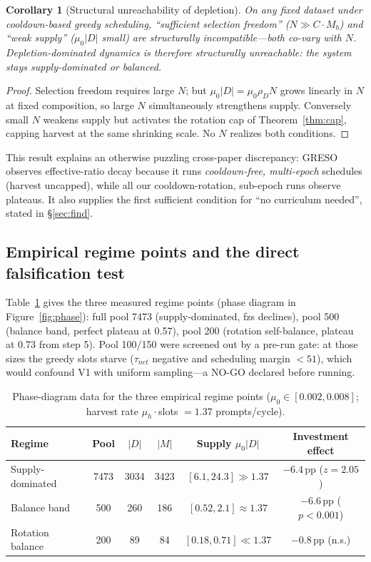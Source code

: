 \documentclass[11pt]{article}
\newtheorem{corollary}[theorem]{Corollary}
\theoremstyle{definition}
\begin{document}
\begin{corollary}[Structural unreachability of depletion]\label{cor:unreach}
On any fixed dataset under cooldown-based greedy scheduling, ``sufficient
selection freedom'' ($N\gg C\cdot M_b$) and ``weak supply'' ($\mu_0|D|$ small) are
structurally incompatible---both co-vary with $N$. Depletion-dominated dynamics is
therefore structurally unreachable: the system stays supply-dominated or balanced.
\end{corollary}
\begin{proof}
Selection freedom requires large $N$; but $\mu_0|D|=\mu_0\rho_D N$ grows linearly
in $N$ at fixed composition, so large $N$ simultaneously strengthens supply.
Conversely small $N$ weakens supply but activates the rotation cap
of Theorem~\ref{thm:cap}, capping harvest at the same shrinking scale. No $N$
realizes both conditions.
\end{proof}

This result explains an otherwise puzzling cross-paper discrepancy: GRESO
\citep{zheng2025greso} observes effective-ratio decay because it runs
\emph{cooldown-free, multi-epoch} schedules (harvest uncapped), while all our
cooldown-rotation, sub-epoch runs observe plateaus. It also supplies the first
sufficient condition for ``no curriculum needed'', stated in \S\ref{sec:find}.

\subsection{Empirical regime points and the direct falsification test}\label{sec:l3-regime}
Table~\ref{tab:phase} gives the three measured regime points (phase diagram in
Figure~\ref{fig:phase}): full pool 7473 (supply-dominated, fzs declines), pool 500
(balance band, perfect plateau at 0.57), pool 200 (rotation self-balance, plateau
at 0.73 from step 5). Pool 100/150 were screened out by a pre-run gate: at those
sizes the greedy slots starve ($\tau_{net}$ negative and scheduling margin $<51$),
which would confound V1 with uniform sampling---a NO-GO declared before running.

\begin{table}[t]
\centering\small
\caption{Phase-diagram data for the three empirical regime points
($\mu_0\in[0.002,0.008]$; harvest rate $\mu_h\cdot$slots $=1.37$ prompts/cycle).}
\label{tab:phase}
\begin{tabular}{@{}lccccc@{}}
\toprule
Regime & Pool & $|D|$ & $|M|$ & Supply $\mu_0|D|$ & Investment effect \\
\midrule
Supply-dominated & 7473 & 3034 & 3423 & $[6.1,24.3]\gg1.37$ & $-6.4$\,pp ($z{=}2.05$) \\
Balance band & 500 & 260 & 186 & $[0.52,2.1]\approx1.37$ & $-6.6$\,pp ($p{<}0.001$) \\
Rotation balance & 200 & 89 & 84 & $[0.18,0.71]\ll1.37$ & $-0.8$\,pp (n.s.) \\
\bottomrule
\end{tabular}
\end{table}
\end{document}
